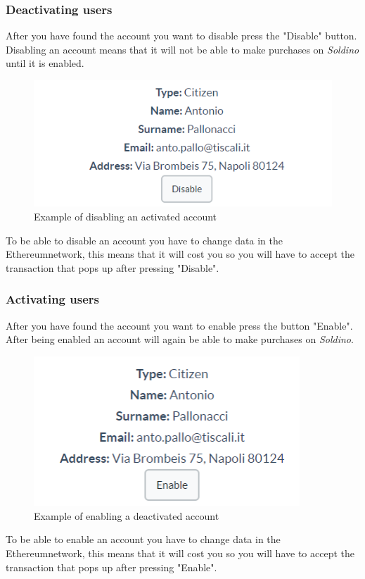 		\subsubsection{Deactivating users}
		After you have found the account you want to disable press the 
		"Disable" button. Disabling an account means that it will not be able to make purchases on \textit{Soldino} 
		until it is enabled.
		\begin{figure}[H]
			\includegraphics[width=13cm]{res/images/users_disable.png}
			\centering
			\caption{Example of disabling an activated account}
		\end{figure}
		\noindent To be able to disable an account you have to change 
		data in the Ethereum\glosp network, this means that it will 
		cost you so you will have to accept the transaction that pops
		up after pressing "Disable".
		\subsubsection{Activating users}
		After you have found the account you want to enable press the button 
		"Enable". After being enabled an account will again be able to make 
		purchases on \textit{Soldino}.
		\begin{figure}[H]
			\includegraphics[width=10cm]{res/images/user_enable.png}
			\centering
			\caption{Example of enabling a deactivated account}
		\end{figure}
		\noindent To be able to enable an account you have to change 
		data in the Ethereum\glosp network, this means that it will 
		cost you so you will have to accept the transaction that pops
		up after pressing "Enable".
